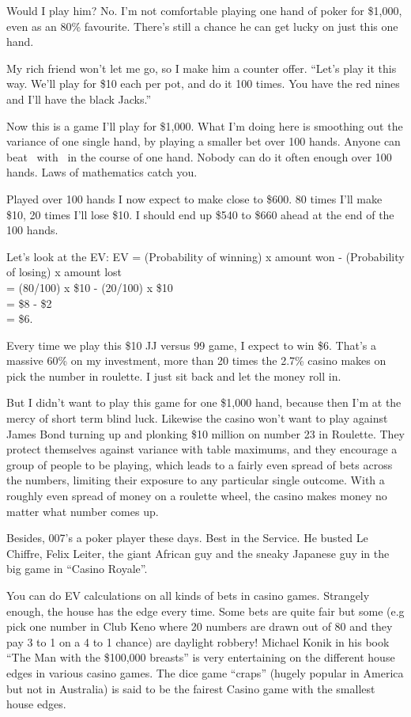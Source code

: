 Would I play him? No. I'm not comfortable playing one hand of poker
for \$1,000, even as an 80\% favourite. There's still a chance he can get 
lucky on just this one hand. 

My rich friend won't let me go, so I make him a counter offer.
``Let's play it this way. We'll play for \$10 each per pot, and do
it 100 times. You have the red nines and I'll have the black Jacks.''

Now this is a game I'll play for \$1,000. What I'm doing here is smoothing
out the variance of one single hand, by playing a smaller bet over
100 hands. Anyone can beat \Jc\Js\ with \nineh\nined\ in the course of one 
hand. Nobody can do it often enough over 100 hands. Laws of mathematics 
catch you.

Played over 100 hands I now expect to make close to \$600. 80 times I'll
make \$10, 20 times I'll lose \$10. I should end up \$540 to \$660 ahead
at the end of the 100 hands.

Let's look at the EV:
EV = (Probability of winning) x amount won - (Probability of losing) x amount lost \\
   = (80/100) x \$10 - (20/100) x \$10 \\
   = \$8 - \$2 \\
   = \$6.

Every time we play this \$10 JJ versus 99 game, I expect to win \$6. That's a 
massive 60\% on my investment, more than 20 times the 2.7\% casino makes on
pick the number in roulette. I just sit back and let the money roll in.

But I didn't want to play this game for one \$1,000 hand, because then
I'm at the mercy of short term blind luck. Likewise the casino won't
want to play against James Bond turning up and plonking \$10 million
on number 23 in Roulette. They protect themselves against variance
with table maximums, and they encourage a group of people to be playing,
which leads to a fairly even spread of bets across the numbers, limiting
their exposure to any particular single outcome. With a roughly even spread
of money on a roulette wheel, the casino makes money no matter what
number comes up.

Besides, 007's a poker player these days. Best in the Service.
He busted Le Chiffre, Felix Leiter, the giant African guy and
the sneaky Japanese guy in the big game in ``Casino Royale''.

You can do EV calculations on all kinds of bets in casino games.
Strangely enough, the house has the edge every time. Some bets
are quite fair but some (e.g pick one number in Club Keno 
where 20 numbers are drawn out of 80 and they pay
3 to 1 on a 4 to 1 chance) are daylight robbery! Michael Konik
in his book ``The Man with the \$100,000 breasts'' is very entertaining on the
different house edges in various casino games. The dice game ``craps''
(hugely popular in America but not in Australia) is said to be
the fairest Casino game with the smallest house edges.

